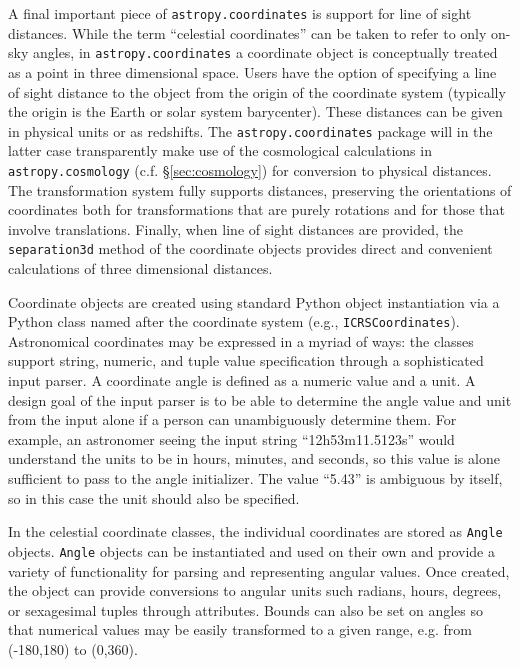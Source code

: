 \documentclass[traditabstract]{aa}
\begin{document}

A final important piece of \texttt{astropy.coordinates} is support for line of
sight distances. While the term ``celestial coordinates'' can be taken to
refer to only on-sky angles, in \texttt{astropy.coordinates} a coordinate
object is conceptually treated as a point in three dimensional space. Users
have the option of specifying a line of sight distance to the object from the
origin of the coordinate system (typically the origin is the Earth or solar
system barycenter). These distances can be given in physical units or as
redshifts. The \texttt{astropy.coordinates} package will in the latter case
transparently make use of the cosmological calculations in
\texttt{astropy.cosmology} (c.f. \S\ref{sec:cosmology}) for conversion to physical distances. The
transformation system fully supports distances, preserving the orientations of
coordinates both for transformations that are purely rotations and for those
that involve translations. Finally, when line of sight distances are provided,
the \texttt{separation3d} method of the coordinate objects provides direct and
convenient calculations of three dimensional distances.


Coordinate objects are created using standard Python object instantiation via
a Python class named after the coordinate system (e.g.,
\texttt{ICRSCoordinates}). Astronomical coordinates may be expressed in a
myriad of ways: the classes support string, numeric, and tuple value
specification through a sophisticated input parser. A coordinate angle is
defined as a numeric value and a unit. A design goal of the input parser is to
be able to determine the angle value and unit from the input alone if a person
can unambiguously determine them. For example, an astronomer seeing the input
string ``12h53m11.5123s'' would understand the units to be in hours, minutes,
and seconds, so this value is alone sufficient to pass to the angle
initializer. The value ``5.43'' is ambiguous by itself, so in this case the
unit should also be specified.

In the celestial coordinate classes, the individual coordinates are stored as
\texttt{Angle} objects. \texttt{Angle} objects can be instantiated and used on
their own and provide a variety of functionality for parsing and representing
angular values. Once created, the object can provide conversions to angular
units such radians, hours, degrees, or sexagesimal tuples through attributes.
Bounds can also be set on angles so that numerical values may be easily
transformed to a given range, e.g. from (-180,180) to (0,360).
\end{document}

